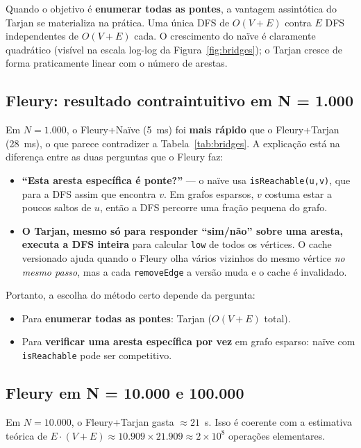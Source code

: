 \documentclass[12pt]{article}
\begin{document}
Quando o objetivo é \textbf{enumerar todas as pontes}, a vantagem
assintótica do Tarjan se materializa na prática. Uma única DFS de
$O(V{+}E)$ contra $E$ DFS independentes de $O(V{+}E)$ cada. O crescimento
do naïve é claramente quadrático (visível na escala log-log da
Figura~\ref{fig:bridges}); o Tarjan cresce de forma praticamente linear
com o número de arestas.

\subsection{Fleury: resultado contraintuitivo em N = 1.000}

Em $N=1.000$, o Fleury+Naïve (5~ms) foi \textbf{mais rápido} que o
Fleury+Tarjan (28~ms), o que parece contradizer a Tabela~\ref{tab:bridges}.
A explicação está na diferença entre as duas perguntas que o Fleury faz:

\begin{itemize}
    \item \textbf{``Esta aresta específica é ponte?''} --- o naïve usa
          \texttt{isReachable(u,v)}, que para a DFS assim que encontra $v$.
          Em grafos esparsos, $v$ costuma estar a poucos saltos de $u$,
          então a DFS percorre uma fração pequena do grafo.
    \item \textbf{O Tarjan, mesmo só para responder ``sim/não'' sobre uma
          aresta, executa a DFS inteira} para calcular \texttt{low} de todos
          os vértices. O cache versionado ajuda quando o Fleury olha vários
          vizinhos do mesmo vértice \emph{no mesmo passo}, mas a cada
          \texttt{removeEdge} a versão muda e o cache é invalidado.
\end{itemize}

Portanto, a escolha do método certo depende da pergunta:
\begin{itemize}
    \item Para \textbf{enumerar todas as pontes}: Tarjan
          ($O(V{+}E)$ total).
    \item Para \textbf{verificar uma aresta específica por vez} em grafo
          esparso: naïve com \texttt{isReachable} pode ser competitivo.
\end{itemize}

\subsection{Fleury em N = 10.000 e 100.000}

Em $N=10.000$, o Fleury+Tarjan gasta $\approx 21$~s. Isso é coerente com
a estimativa teórica de
$E \cdot (V{+}E) \approx 10.909 \times 21.909 \approx 2 \times 10^8$
operações elementares.
\end{document}
